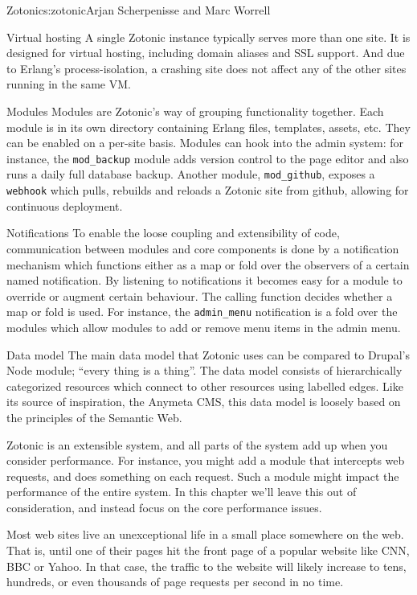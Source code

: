\begin{aosachapter}{Zotonic}{s:zotonic}{Arjan Scherpenisse and Marc Worrell}
\begin{aosadescription}
\item[Virtual hosting]
A single Zotonic instance typically serves more than one site. It is
designed for virtual hosting, including domain aliases and SSL support.
And due to Erlang's process-isolation, a crashing site does not affect
any of the other sites running in the same VM.
\item[Modules]
Modules are Zotonic's way of grouping functionality together. Each
module is in its own directory containing Erlang files, templates,
assets, etc. They can be enabled on a per-site basis. Modules can hook
into the admin system: for instance, the \texttt{mod\_backup} module
adds version control to the page editor and also runs a daily full
database backup. Another module, \texttt{mod\_github}, exposes a
\texttt{webhook} which pulls, rebuilds and reloads a Zotonic site from
github, allowing for continuous deployment.
\item[Notifications]
To enable the loose coupling and extensibility of code, communication
between modules and core components is done by a notification mechanism
which functions either as a map or fold over the observers of a certain
named notification. By listening to notifications it becomes easy for a
module to override or augment certain behaviour. The calling function
decides whether a map or fold is used. For instance, the
\texttt{admin\_menu} notification is a fold over the modules which allow
modules to add or remove menu items in the admin menu.
\item[Data model]
The main data model that Zotonic uses can be compared to Drupal's Node
module; ``every thing is a thing''. The data model consists of
hierarchically categorized resources which connect to other resources
using labelled edges. Like its source of inspiration, the Anymeta CMS,
this data model is loosely based on the principles of the Semantic Web.
\end{aosadescription}

Zotonic is an extensible system, and all parts of the system add up when
you consider performance. For instance, you might add a module that
intercepts web requests, and does something on each request. Such a
module might impact the performance of the entire system. In this
chapter we'll leave this out of consideration, and instead focus on the
core performance issues.


Most web sites live an unexceptional life in a small place somewhere on
the web. That is, until one of their pages hit the front page of a
popular website like CNN, BBC or Yahoo. In that case, the traffic to the
website will likely increase to tens, hundreds, or even thousands of
page requests per second in no time.


\end{aosachapter}
